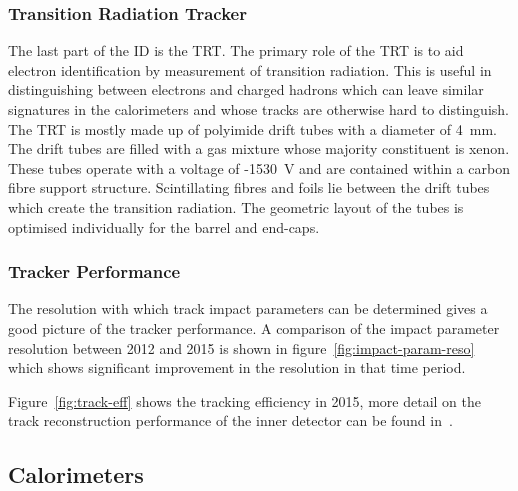 \subsubsection{Transition Radiation Tracker}

The last part of the ID is the TRT. The primary role of the TRT is to aid
electron identification by measurement of transition radiation. This is useful
in distinguishing between electrons and charged hadrons which can leave similar
signatures in the calorimeters and whose tracks are otherwise hard to
distinguish. The TRT is mostly made up of polyimide drift tubes with a diameter
of 4~mm. The drift tubes are filled with a gas mixture whose majority
constituent is xenon. These tubes operate with a voltage of -1530~V and are
contained within a carbon fibre support structure. Scintillating fibres and
foils lie between the drift tubes which create the transition radiation.  The
geometric layout of the tubes is optimised individually for the barrel and
end-caps.

\subsubsection{Tracker Performance}
The resolution with which track impact parameters can be determined gives a good
picture of the tracker performance. A comparison of the impact parameter
resolution between 2012 and 2015 is shown in figure~\ref{fig:impact-param-reso}
which shows significant improvement in the resolution in that time period.

Figure~\ref{fig:track-eff} shows the tracking efficiency in 2015, more detail on
the track reconstruction performance of the inner detector can be found
in~\cite{ATL-PHYS-PUB-2015-018}.


\clearpage
\newpage

\subsection{Calorimeters}%
\label{sec:calo}

